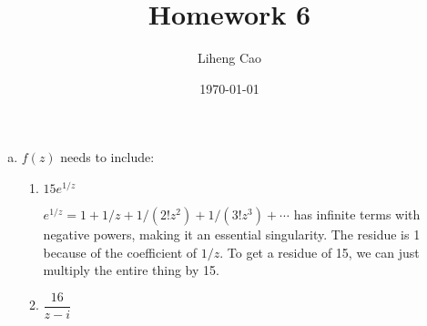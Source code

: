 \documentclass[12pt]{article}
\title{Homework 6} %
\author{Liheng Cao} %
\date{\today} %
\begin{document}
\maketitle

\section{}
\begin{enumerate}[a)]
	\item $ f(z) $ needs to include:
	\begin{enumerate}[1)]
		\item $ 15 e^{1/z} $
		\par$ e^{1/z} = 1 + 1/z + 1/(2!z^2) + 1/(3! z^3) + \cdots$ has infinite terms with negative powers, making it an essential singularity. The residue is 1 because of the coefficient of $ 1/z $. To get a residue of 15, we can just multiply the entire thing by 15.
		
		\item $ \dfrac{16}{z-i} $
		
		
	\end{enumerate}
\end{enumerate}
\end{document}
